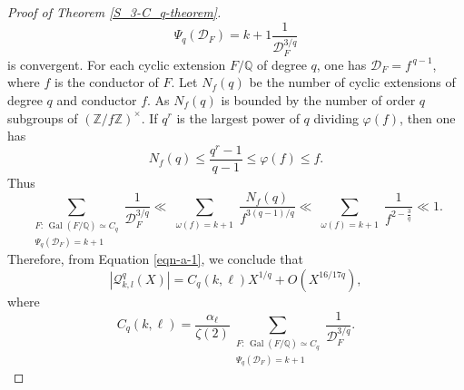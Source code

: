 \documentclass[10pt,a4paper]{amsart}
\DeclareMathOperator{\Gal}{Gal}
\newcommand{\cQ}{\mathcal{Q}}
\begin{document}
\begin{proof}[Proof of Theorem \ref{S_3-C_q-theorem}]
\begin{equation}
{{        \Psi_q(\mathcal{D}_F)=k+1}}
    \frac{1}{\mathcal{D}_F^{3/q}}
\end{equation}
is convergent. For each cyclic extension $F/\mathbb{Q}$ of degree $q$, one has
$\mathcal{D}_F = f^{\,q-1}$, where $f$ is the conductor of $F$. Let $N_f(q)$ be the number of cyclic extensions of degree $q$ and conductor $f$.
As $N_f(q)$ is bounded by the number of order $q$ subgroups of
$(\mathbb{Z}/f\mathbb{Z})^\times$. If $q^{r}$ is the largest power of $q$ dividing $\varphi(f)$, then one has 
\[
    N_f(q)
    \le \frac{q^{r}-1}{q-1}
    \le \varphi(f)
    \le f.
\]
Thus
\begin{equation*}
\sum_{\substack{
        F:\, \Gal(F/\mathbb{Q})\simeq C_q \\ \Psi_q(\mathcal{D}_F)=k+1}
        }
\frac{1}{\mathcal{D}_F^{3/q}}
\ll
\sum_{\substack{\omega(f)=k+1}}
\frac{N_f(q)}{f^{3(q-1)/q}}
\ll
\sum_{\substack{\omega(f)=k+1}}
\frac{1}{f^{2-\frac{3}{q}}} \ll 1. 
\end{equation*}
Therefore, from Equation \eqref{eqn-a-1}, we conclude that
\begin{equation*}
    |\cQ^q_{k,l}(X)| = C_q(k,\ell) X^{1/q} + O(X^{16/17q}),
\end{equation*}
where
\begin{equation}\label{implied-constant-1}
    C_q(k,\ell)
    =
    \frac{\alpha_{\ell}}{\zeta(2)}
    \sum_{\substack{
        F:\, \Gal(F/\mathbb{Q})\simeq C_q\\
        \Psi_q(\mathcal{D}_F)=k+1}}
    \frac{1}{\mathcal{D}_F^{3/q}}.
\end{equation}
\end{proof}
\end{document}

